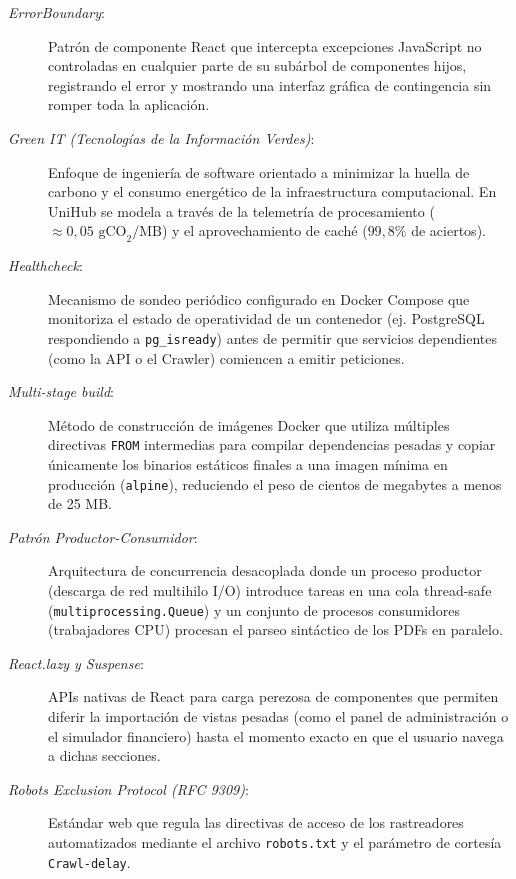 \begin{description}
    \item[\textit{ErrorBoundary}:] Patrón de componente React que intercepta excepciones JavaScript no controladas en cualquier parte de su subárbol de componentes hijos, registrando el error y mostrando una interfaz gráfica de contingencia sin romper toda la aplicación.

    \item[\textit{Green IT (Tecnologías de la Información Verdes)}:] Enfoque de ingeniería de software orientado a minimizar la huella de carbono y el consumo energético de la infraestructura computacional. En UniHub se modela a través de la telemetría de procesamiento ($\approx 0{,}05\text{ gCO}_2/\text{MB}$) y el aprovechamiento de caché ($99{,}8\%$ de aciertos).

    \item[\textit{Healthcheck}:] Mecanismo de sondeo periódico configurado en Docker Compose que monitoriza el estado de operatividad de un contenedor (ej. PostgreSQL respondiendo a \texttt{pg\_isready}) antes de permitir que servicios dependientes (como la API o el Crawler) comiencen a emitir peticiones.

    \item[\textit{Multi-stage build}:] Método de construcción de imágenes Docker que utiliza múltiples directivas \texttt{FROM} intermedias para compilar dependencias pesadas y copiar únicamente los binarios estáticos finales a una imagen mínima en producción (\texttt{alpine}), reduciendo el peso de cientos de megabytes a menos de 25 MB.

    \item[\textit{Patrón Productor-Consumidor}:] Arquitectura de concurrencia desacoplada donde un proceso productor (descarga de red multihilo I/O) introduce tareas en una cola thread-safe (\texttt{multiprocessing.Queue}) y un conjunto de procesos consumidores (trabajadores CPU) procesan el parseo sintáctico de los PDFs en paralelo.

    \item[\textit{React.lazy y Suspense}:] APIs nativas de React para carga perezosa de componentes que permiten diferir la importación de vistas pesadas (como el panel de administración o el simulador financiero) hasta el momento exacto en que el usuario navega a dichas secciones.

    \item[\textit{Robots Exclusion Protocol (RFC 9309)}:] Estándar web que regula las directivas de acceso de los rastreadores automatizados mediante el archivo \texttt{robots.txt} y el parámetro de cortesía \texttt{Crawl-delay}.


\end{description}
